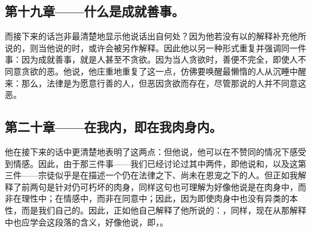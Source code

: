 
\subsection{第十九章——什么是成就善事。}

而接下来的话岂非最清楚地显示他说话出自何处？因为他若没有以的解释补充他所说的，则当他说的时，或许会被另作解释。因此他以另一种形式重复并强调同一件事：因为成就善事，就是人甚至不贪欲。因为当人贪欲时，善便不完全，即使人不同意贪欲的恶。他说，他庄重地重复了这一点，仿佛要唤醒最懒惰的人从沉睡中醒来：那么，法律是为愿意行善的人，但恶因贪欲而存在，尽管那说的人并不同意这恶。\par


\subsection{第二十章——在我内，即在我肉身内。}

他在接下来的话中更清楚地表明了这两点：但他说，他可以在不赞同的情况下感受到情感。因此，由于那三件事——我们已经讨论过其中两件，即他说和，以及这第三件——宗徒似乎是在描述一个仍在法律之下、尚未在恩宠之下的人。但正如我解释了前两句是针对仍可朽坏的肉身，同样这句也可理解为好像他说是在肉身中，而非在理性中；在情感中，而非在同意中；因此，因为即使肉身中也没有异类的本性，而是我们自己的。因此，正如他自己解释了他所说的：，同样，现在从那解释中也应学会这段落的含义，好像他说，即，。\par

